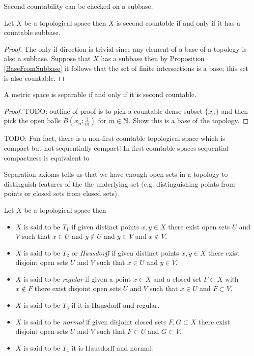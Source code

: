Second countability can be checked on a subbase.
\begin{prop}\label{SecondCountabilityViaSubbase}Let $X$ be a topological space then $X$ is second countable if and only if it has a countable subbase.
\end{prop}
\begin{proof}
The only if direction is trivial since any element of a base of a topology is also a subbase. Suppose that $X$ has a subbase then by Proposition \ref{BaseFromSubbase} it follows that the set of finite intersections is a base; this set is also countable.
\end{proof}

\begin{lem}\label{SeparabilitySecondCountabilityMetricSpaces}A metric space is separable if and only if it is second countable.
\end{lem}
\begin{proof}
TODO:
outline of proof is to pick a countable dense subset $\lbrace x_n
\rbrace$ and then pick the open balls $B(x_n; \frac{1}{m})$ for $m \in
\mathbb{N}$.  Show this is a base of the topology.
\end{proof}

TODO:  Fun fact, there is a non-first countable topological space
which is compact but not sequentially compact!  In first countable
spaces sequential compactness is equivalent to 

Separation axioms tells us that we have enough open sets in a topology
to distinguish features of the the underlying set (e.g. distinguishing
points from points or closed sets from closed sets).

\begin{defn}Let $X$ be a topological space then
  \begin{itemize}
    \item[(i)] $X$ is said to be $T_1$ if given distinct points $x,y \in X$ there exist open sets $U$ and $V$ such that $x \in U$ and $y \notin U$ and $y \in V$ and $x \notin V$.
    \item[(ii)] $X$ is said to be $T_2$ or \emph{Hausdorff} if given distinct points $x,y \in X$ there exist disjoint open sets $U$ and $V$ such that $x \in U$ and $y \in V$.
    \item[(iii)] $X$ is said to be \emph{regular} if given a point $x \in X$ and a closed set $F \subset X$ with $x \notin F$ there exist disjoint open sets $U$ and $V$ such that $x \in U$ and $F \subset V$.
    \item[(iv)] $X$ is said to be $T_3$ if it is Hausdorff and regular.
    \item[(v)] $X$ is said to be \emph{normal} if given disjoint closed sets $F,G \subset X$ there exist disjoint open sets $U$ and $V$ such that $F \subset U$ and $G \subset V$.
    \item[(vi)] $X$ is said to be $T_4$ it is Hausdorff and normal.
  \end{itemize}
\end{defn}

